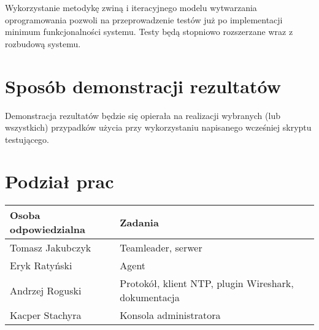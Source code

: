 \documentclass[10pt,a4paper]{article}
\begin{document}
	    Wykorzystanie metodykę zwiną i iteracyjnego modelu wytwarzania oprogramowania pozwoli na przeprowadzenie testów już po implementacji minimum funkcjonalności systemu. Testy będą stopniowo rozszerzane wraz z rozbudową systemu.

	\section{Sposób  demonstracji rezultatów}
		Demonstracja rezultatów będzie się opierała na realizacji wybranych (lub wszystkich) przypadków użycia przy wykorzystaniu napisanego wcześniej skryptu testującego.

	\section{Podział prac}
	
	    \begin{tabular}{ l | l }
		    \textbf{Osoba odpowiedzialna} & \textbf{Zadania} \\
		    \hline
		    Tomasz Jakubczyk  & Teamleader, serwer  \\
		    Eryk Ratyński  & Agent  \\
		    Andrzej Roguski  & Protokół, klient NTP, plugin Wireshark, dokumentacja \\
		    Kacper Stachyra & Konsola administratora \\
		\end{tabular}  
		
\end{document}
